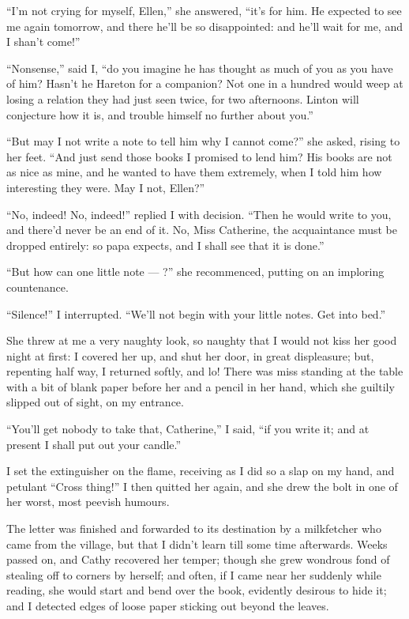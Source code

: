 \par “I'm not crying for myself, Ellen,” she answered, “it's for him. He expected to see me again tomorrow, and there he'll be so disappointed: and he'll wait for me, and I shan't come!”
\par “Nonsense,” said I, “do you imagine he has thought as much of you as you have of him? Hasn't he Hareton for a companion? Not one in a hundred would weep at losing a relation they had just seen twice, for two afternoons. Linton will conjecture how it is, and trouble himself no further about you.”
\par “But may I not write a note to tell him why I cannot come?” she asked, rising to her feet. “And just send those books I promised to lend him? His books are not as nice as mine, and he wanted to have them extremely, when I told him how interesting they were. May I not, Ellen?”
\par “No, indeed! No, indeed!” replied I with decision. “Then he would write to you, and there'd never be an end of it. No, Miss Catherine, the acquaintance must be dropped entirely: so papa expects, and I shall see that it is done.”
\par “But how can one little note — ?” she recommenced, putting on an imploring countenance.
\par “Silence!” I interrupted. “We'll not begin with your little notes. Get into bed.”
\par She threw at me a very naughty look, so naughty that I would not kiss her good night at first: I covered her up, and shut her door, in great displeasure; but, repenting half way, I returned softly, and lo! There was miss standing at the table with a bit of blank paper before her and a pencil in her hand, which she guiltily slipped out of sight, on my entrance.
\par “You'll get nobody to take that, Catherine,” I said, “if you write it; and at present I shall put out your candle.”
\par I set the extinguisher on the flame, receiving as I did so a slap on my hand, and petulant “Cross thing!” I then quitted her again, and she drew the bolt in one of her worst, most peevish humours.
\par The letter was finished and forwarded to its destination by a milkfetcher who came from the village, but that I didn't learn till some time afterwards. Weeks passed on, and Cathy recovered her temper; though she grew wondrous fond of stealing off to corners by herself; and often, if I came near her suddenly while reading, she would start and bend over the book, evidently desirous to hide it; and I detected edges of loose paper sticking out beyond the leaves.
